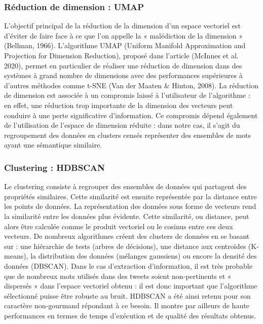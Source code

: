 \subsubsection*{Réduction de dimension : UMAP}

L'objectif principal de la réduction de la dimension d'un espace vectoriel est
d'éviter de faire face à ce que l'on appelle la « malédiction de la dimension »
(Bellman, 1966). L'algorithme UMAP (Uniform Manifold Approximation and
Projection for Dimension Reduction), proposé dans l'article (McInnes et al. 2020),
permet en particulier de réaliser une réduction de dimension dans des systèmes
à grand nombre de dimensions avec des performances supérieures à d'autres
méthodes comme t-SNE (Van der Maaten & Hinton, 2008). La réduction de
dimension est associée à un compromis laissé à l'utilisateur de l'algorithme : en effet,
une réduction trop importante de la dimension des vecteurs peut conduire à une
perte significative d'information. Ce compromis dépend également de l'utilisation de
l'espace de dimension réduite : dans notre cas, il s'agit du regroupement des données
en clusters censés représenter des ensembles de mots ayant une sémantique similaire.

\subsubsection*{Clustering : HDBSCAN}

Le clustering consiste à regrouper des ensembles de données qui partagent des
propriétés similaires. Cette similarité est ensuite représentée par la distance entre
les points de données. La représentation des données sous forme de vecteurs
rend la similarité entre les données plus évidente. Cette similarité, ou distance,
peut alors être calculée comme le produit vectoriel ou le cosinus entre ces deux
vecteurs. De nombreux algorithmes créent des clusters de données en se basant
sur : une hiérarchie de tests (arbres de décisions), une distance aux centroïdes
(K-means), la distribution des données (mélanges gaussiens) ou encore la densité
des données (DBSCAN). Dans le cas d'extraction d'information, il est très
probable que de nombreux mots utilisés dans des tweets soient non-pertinents et
« dispersés » dans l'espace vectoriel obtenu : il est donc important que l'algorithme
sélectionné puisse être robuste au bruit. HDBSCAN a été ainsi retenu pour son
caractère non-gourmand répondant à ce besoin. Il montre par ailleurs de haute
performances en termes de temps d'exécution et de qualité des résultats obtenus.


